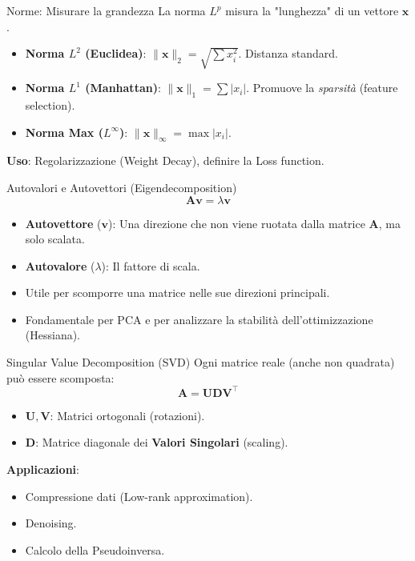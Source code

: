 \documentclass[aspectratio=169, 10pt]{beamer}
\begin{document}
\begin{frame}{Norme: Misurare la grandezza}
    La norma $L^p$ misura la "lunghezza" di un vettore $\mathbf{x}$.
    \begin{itemize}
        \item \textbf{Norma $L^2$ (Euclidea)}: $\|\mathbf{x}\|_2 = \sqrt{\sum x_i^2}$. Distanza standard.
        \item \textbf{Norma $L^1$ (Manhattan)}: $\|\mathbf{x}\|_1 = \sum |x_i|$. Promuove la \emph{sparsità} (feature selection).
        \item \textbf{Norma Max ($L^\infty$)}: $\|\mathbf{x}\|_\infty = \max |x_i|$.
    \end{itemize}
    \vspace{0.5em}
    \textbf{Uso}: Regolarizzazione (Weight Decay), definire la Loss function.
\end{frame}

\begin{frame}{Autovalori e Autovettori (Eigendecomposition)}
    \[ \mathbf{A}\mathbf{v} = \lambda \mathbf{v} \]
    \begin{itemize}
        \item \textbf{Autovettore} ($\mathbf{v}$): Una direzione che non viene ruotata dalla matrice $\mathbf{A}$, ma solo scalata.
        \item \textbf{Autovalore} ($\lambda$): Il fattore di scala.
        \item Utile per scomporre una matrice nelle sue direzioni principali.
        \item Fondamentale per PCA e per analizzare la stabilità dell'ottimizzazione (Hessiana).
    \end{itemize}
\end{frame}

\begin{frame}{Singular Value Decomposition (SVD)}
    Ogni matrice reale (anche non quadrata) può essere scomposta:
    \[ \mathbf{A} = \mathbf{U} \mathbf{D} \mathbf{V}^\top \]
    \begin{itemize}
        \item $\mathbf{U}, \mathbf{V}$: Matrici ortogonali (rotazioni).
        \item $\mathbf{D}$: Matrice diagonale dei \textbf{Valori Singolari} (scaling).
    \end{itemize}
    \vspace{0.5em}
    \textbf{Applicazioni}: 
    \begin{itemize}
        \item Compressione dati (Low-rank approximation).
        \item Denoising.
        \item Calcolo della Pseudoinversa.
    \end{itemize}
\end{frame}
\end{document}
